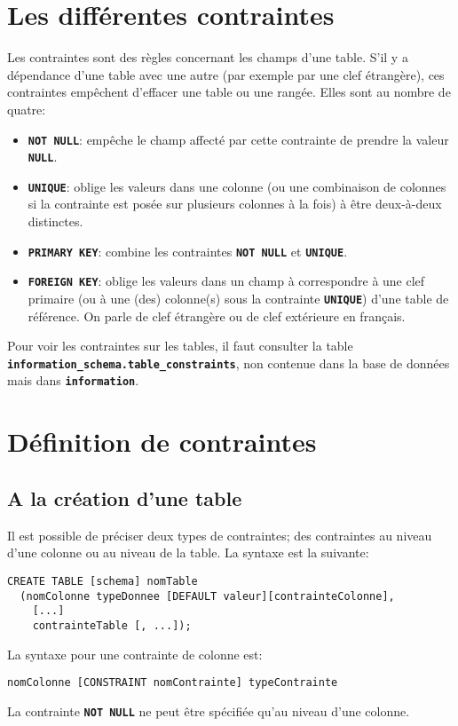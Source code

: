 \documentclass[a4paper, 12pt]{report}
\newcommand{\textSQL}[1]{\texttt{\textbf{#1}}}
\theoremstyle{definition} \newtheorem{ex}{Exemple}
\begin{document}
\section{Les différentes contraintes}
Les contraintes sont des règles concernant les champs d'une table. S'il y a dépendance d'une table avec une autre (par exemple par une clef étrangère), ces contraintes empêchent d'effacer une table ou une rangée. Elles sont au nombre de quatre:
\begin{itemize}
  \item \textSQL{NOT NULL}: empêche le champ affecté par cette contrainte de prendre la valeur \textSQL{NULL}.
	\item \textSQL{UNIQUE}: oblige les valeurs dans une colonne (ou une combinaison de colonnes si la contrainte est posée sur plusieurs colonnes à la fois) à être deux-à-deux distinctes.
	\item \textSQL{PRIMARY KEY}: combine les contraintes \textSQL{NOT NULL} et \textSQL{UNIQUE}.
	\item \textSQL{FOREIGN KEY}: oblige les valeurs dans un champ à correspondre à une clef primaire (ou à une (des) colonne(s) sous la contrainte \textSQL{UNIQUE}) d'une table de référence. On parle de clef étrangère ou de clef extérieure en français.
\end{itemize}
Pour voir les contraintes sur les tables, il faut consulter la table \textSQL{information\_schema.table\_constraints}, non contenue dans la base de données mais dans \textSQL{information}.

\section{Définition de contraintes}
\subsection{A la création d'une table}
Il est possible de préciser deux types de contraintes; des contraintes au niveau d'une colonne ou au niveau de la table. La syntaxe est la suivante:
\begin{lstlisting}[frame=single]
CREATE TABLE [schema] nomTable
  (nomColonne typeDonnee [DEFAULT valeur][contrainteColonne],
	[...]
	contrainteTable [, ...]);
\end{lstlisting}
La syntaxe pour une contrainte de colonne est:
\begin{lstlisting}[frame=single]
nomColonne [CONSTRAINT nomContrainte] typeContrainte
\end{lstlisting}
La contrainte \textSQL{NOT NULL} ne peut être spécifiée qu'au niveau d'une colonne.
\end{document}
